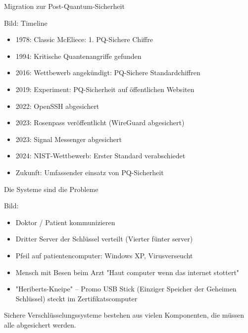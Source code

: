 
\begin{frame}[T]{Migration zur Post-Quantum-Sicherheit}

Bild: Timeline
%

\begin{itemize}
  \item 1978: Classic McEliece: 1. PQ-Sichere Chiffre
  \item 1994: Kritische Quantenangriffe gefunden
  \item 2016: Wettbewerb angekündigt: PQ-Sichere Standardchiffren %
  \item 2019: Experiment: PQ-Sicherheit auf öffentlichen Websiten %
  \item 2022: OpenSSH abgesichert %
  \item 2023: Rosenpass veröffentlicht (WireGuard abgesichert)
  \item 2023: Signal Messenger abgesichert %
  \item 2024: NIST-Wettbewerb: Erster Standard verabschiedet %
  \item Zukunft: Umfassender einsatz von PQ-Sicherheit
\end{itemize}

\end{frame}

\begin{frame}[T]{Die Systeme sind die Probleme}

Bild:
\begin{itemize}
  \item Doktor / Patient kommunizieren
  \item Dritter Server der Schlüssel verteilt (Vierter fünter server)
  \item Pfeil auf patientencomputer: Windows XP, Virusverseucht
  \item Mensch mit Besen beim Arzt "Haut computer wenn das internet stottert"
  \item "Heriberts-Kneipe" – Promo USB Stick (Einziger Speicher der Geheimen Schlüssel) steckt im Zertifikatscomputer
\end{itemize}

Sichere Verschlüsselungssysteme bestehen aus vielen Komponenten,
die müssen alle abgesichert werden.
\end{frame}

